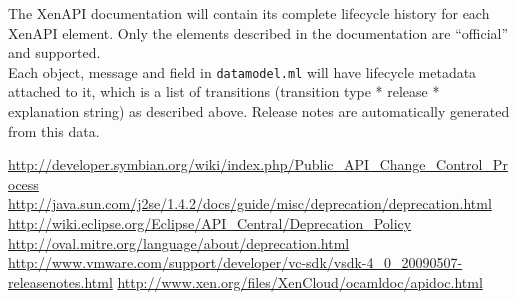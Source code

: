 \documentclass[a4paper]{article}
\begin{document}
The XenAPI documentation will contain its complete lifecycle history for each XenAPI element. Only the elements described in the documentation are ``official'' and supported.\\

Each object, message and field in \texttt{datamodel.ml} will have lifecycle metadata attached to it, which is a list of transitions (transition type * release * explanation string) as described above. Release notes are automatically generated from this data.


\begin{thebibliography}{}
 \url{http://developer.symbian.org/wiki/index.php/Public_API_Change_Control_Process}
 \url{http://java.sun.com/j2se/1.4.2/docs/guide/misc/deprecation/deprecation.html}
 \url{http://wiki.eclipse.org/Eclipse/API_Central/Deprecation_Policy}
 \url{http://oval.mitre.org/language/about/deprecation.html}
 \url{http://www.vmware.com/support/developer/vc-sdk/vsdk-4_0_20090507-releasenotes.html}
 \url{http://www.xen.org/files/XenCloud/ocamldoc/apidoc.html}
\end{thebibliography}


\end{document}
